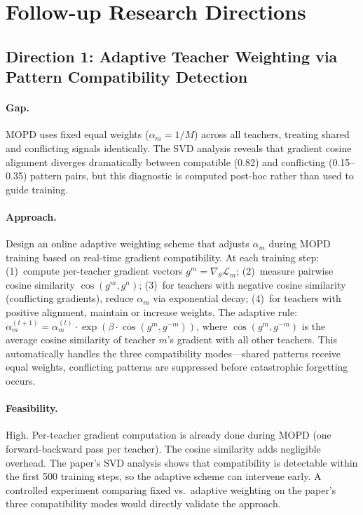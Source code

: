 \documentclass[11pt,a4paper]{article}
\begin{document}
\section{Follow-up Research Directions}

\subsection{Direction 1: Adaptive Teacher Weighting via Pattern Compatibility Detection}

\paragraph{Gap.}
MOPD uses fixed equal weights ($\alpha_m = 1/M$) across all teachers, treating shared and conflicting signals identically. The SVD analysis reveals that gradient cosine alignment diverges dramatically between compatible (0.82) and conflicting (0.15--0.35) pattern pairs, but this diagnostic is computed post-hoc rather than used to guide training.

\paragraph{Approach.}
Design an online adaptive weighting scheme that adjusts $\alpha_m$ during MOPD training based on real-time gradient compatibility. At each training step: (1)~compute per-teacher gradient vectors $g^m = \nabla_\theta \mathcal{L}_m$; (2)~measure pairwise cosine similarity $\cos(g^m, g^n)$; (3)~for teachers with negative cosine similarity (conflicting gradients), reduce $\alpha_m$ via exponential decay; (4)~for teachers with positive alignment, maintain or increase weights. The adaptive rule: $\alpha_m^{(t+1)} = \alpha_m^{(t)} \cdot \exp(\beta \cdot \overline{\cos}(g^m, g^{-m}))$, where $\overline{\cos}(g^m, g^{-m})$ is the average cosine similarity of teacher $m$'s gradient with all other teachers. This automatically handles the three compatibility modes---shared patterns receive equal weights, conflicting patterns are suppressed before catastrophic forgetting occurs.

\paragraph{Feasibility.}
High. Per-teacher gradient computation is already done during MOPD (one forward-backward pass per teacher). The cosine similarity adds negligible overhead. The paper's SVD analysis shows that compatibility is detectable within the first 500 training steps, so the adaptive scheme can intervene early. A controlled experiment comparing fixed vs.\ adaptive weighting on the paper's three compatibility modes would directly validate the approach.
\end{document}
